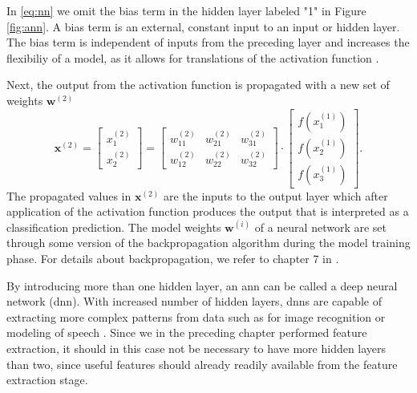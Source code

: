 In \eqref{eq:nn} we omit the bias term in the hidden layer labeled "1" in Figure \ref{fig:ann}. A bias term is an external, constant input to an input or hidden layer. The bias term is independent of inputs from the preceding layer and increases the flexibiliy of a model, as it allows for translations of the activation function \citep{kohl_2010}.

Next, the output from the activation function is propagated with a new set of weights $\mathbf{w}^{(2)}$
\begin{equation}
	\mathbf{x}^{(2)}=\begin{bmatrix}x_1^{(2)} \\ x_2^{(2)} \end{bmatrix} = 
	\begin{bmatrix} w_{11}^{(2)} & w_{21}^{(2)} & w_{31}^{(2)} \\ w_{12}^{(2)} & w_{22}^{(2)} & w_{32}^{(2)} \end{bmatrix}\cdot \begin{bmatrix}f(x_1^{(1)}) \\ f(x_2^{(1)}) \\ f(x_3^{(1)}) \end{bmatrix}.
\end{equation}
The propagated values in $\mathbf{x}^{(2)}$ are the inputs to the output layer which after application of the activation function produces the output that is interpreted as a classification prediction. The model weights $\mathbf{w}^{(i)}$ of a neural network are set through some version of the backpropagation algorithm during the model training phase. For details about backpropagation, we refer to chapter 7 in \citep{rojas_1996}.

By introducing more than one hidden layer, an \gls{ann} can be called a deep neural network (\gls{dnn}). With increased number of hidden layers, \gls{dnn}s are capable of extracting more complex patterns from data such as for image recognition \citep{szegedy_liu_jia_sermanet_reed_anguelov_erhan_vanhoucke_rabinovich_2018} or modeling of speech \citep{hinton_deng_yu_dahl_mohamed_jaitly_senior_vanhoucke_nguyen_sainath_2012}. Since we in the preceding chapter performed feature extraction, it should in this case not be necessary to have more hidden layers than two, since useful features should already readily available from the feature extraction stage.

